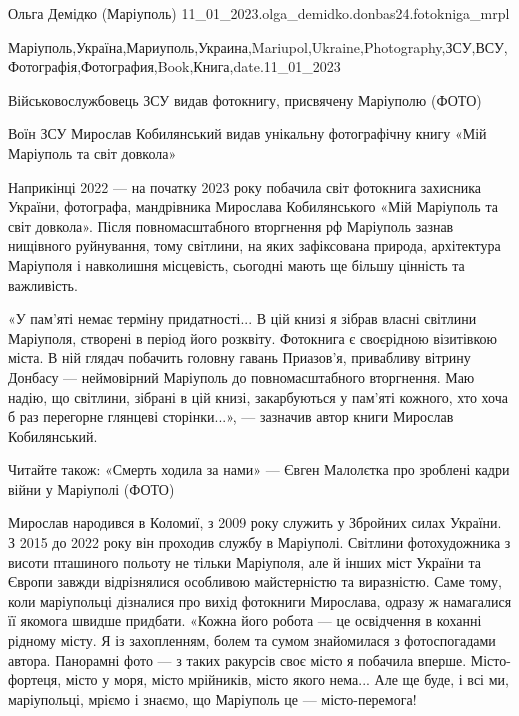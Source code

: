  
 
 
 
 

Ольга Демідко (Маріуполь)
11_01_2023.olga_demidko.donbas24.fotokniga_mrpl

Маріуполь,Україна,Мариуполь,Украина,Mariupol,Ukraine,Photography,ЗСУ,ВСУ,Фотографія,Фотография,Book,Книга,date.11_01_2023

Військовослужбовець ЗСУ видав фотокнигу, присвячену Маріуполю (ФОТО)

Воїн ЗСУ Мирослав Кобилянський видав унікальну фотографічну книгу «Мій
Маріуполь та світ довкола»

Наприкінці 2022 — на початку 2023 року побачила світ фотокнига захисника
України, фотографа, мандрівника Мирослава Кобилянського «Мій Маріуполь та світ
довкола». Після повномасштабного вторгнення рф Маріуполь зазнав нищівного
руйнування, тому світлини, на яких зафіксована природа, архітектура Маріуполя і
навколишня місцевість, сьогодні мають ще більшу цінність та важливість.

«У пам'яті немає терміну придатності... В цій книзі я зібрав власні світлини
Маріуполя, створені в період його розквіту. Фотокнига є своєрідною візитівкою
міста. В ній глядач побачить головну гавань Приазов'я, привабливу вітрину
Донбасу — неймовірний Маріуполь до повномасштабного вторгнення. Маю надію, що
світлини, зібрані в цій книзі, закарбуються у пам'яті кожного, хто хоча б раз
перегорне глянцеві сторінки...», — зазначив автор книги Мирослав Кобилянський.

Читайте також: «Смерть ходила за нами» — Євген Малолєтка про зроблені кадри війни у Маріуполі (ФОТО)

Мирослав народився в Коломиї, з 2009 року служить у Збройних силах України. З
2015 до 2022 року він проходив службу в Маріуполі. Світлини фотохудожника з
висоти пташиного польоту не тільки Маріуполя, але й інших міст України та
Європи завжди відрізнялися особливою майстерністю та виразністю. Саме тому,
коли маріупольці дізналися про вихід фотокниги Мирослава, одразу ж намагалися
її якомога швидше придбати.  «Кожна його робота — це освідчення в коханні
рідному місту. Я із захопленням, болем та сумом знайомилася з фотоспогадами
автора. Панорамні фото — з таких ракурсів своє місто я побачила вперше.
Місто-фортеця, місто у моря, місто мрійників, місто якого нема... Але ще буде, і
всі ми, маріупольці, мріємо і знаємо, що Маріуполь це — місто-перемога!

